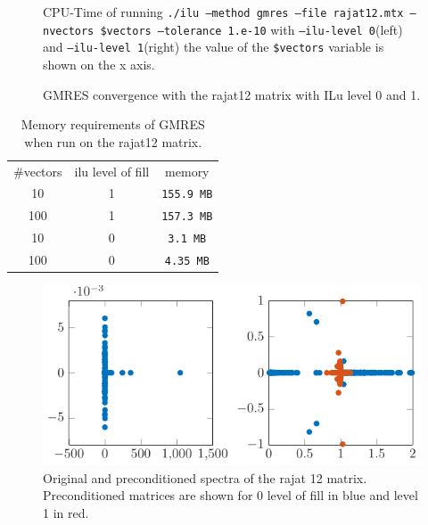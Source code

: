 \begin{figure}
\centering

\caption{CPU-Time of running \texttt{./ilu --method gmres --file rajat12.mtx  --nvectors \$vectors --tolerance 1.e-10} with \texttt{--ilu-level 0}(left) and \texttt{--ilu-level 1}(right) the value of the \texttt{\$vectors} variable is shown on the x axis.}
\label{fig:iluRajatCompTime}
\end{figure} 
\begin{figure}
\centering

\caption{GMRES convergence with the rajat12 matrix with ILu level 0 and 1.}
\label{fig:rajatConvergence}
\end{figure}
\begin{table}
\centering
\begin{tabular}{|c|c|c|} \hline
  \#vectors & ilu level of fill & memory \\
   10 & 1 & \texttt{155.9 MB} \\
   100 & 1 & \texttt{157.3 MB} \\
   10 &  0 & \texttt{3.1 MB} \\
   100 & 0 & \texttt{4.35 MB} \\ \hline
\end{tabular}
\caption{Memory requirements of GMRES when run on the rajat12 matrix. }
\label{tab:RajatMemoryGMRES}
\end{table}
\begin{figure}
\centering
\includegraphics[scale=1]{../src/figure/spectraRajat12.pdf}
%
\caption{Original and preconditioned spectra of the rajat 12 matrix. Preconditioned matrices are shown for 0 level of fill in blue and level 1 in  red.}
\label{fig:rajatSpectra}
\end{figure} 
 
 
 
